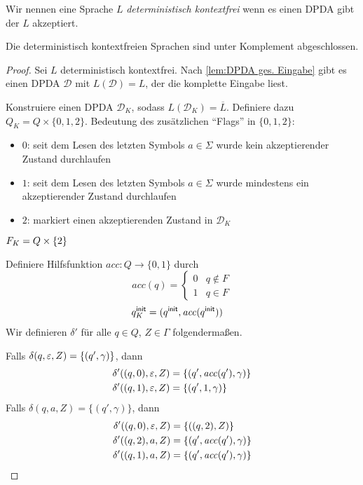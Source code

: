 \begin{Def}
 Wir nennen eine Sprache $L$ \emph{deterministisch kontextfrei} wenn es einen \ac{DPDA} gibt der $L$ akzeptiert.
\end{Def}


\begin{Satz}[name={[Abgeschlossenheit der deterministischen \acs*{CFL}]}]
        Die deterministisch kontextfreien Sprachen sind unter Komplement abgeschlossen.
\end{Satz}
\begin{proof}
  Sei $L$ deterministisch kontextfrei. 
  Nach \autoref{lem:DPDA ges. Eingabe} gibt es einen \ac{DPDA} $\mathcal{D}$ mit $L(\mathcal{D})=L$, der die komplette Eingabe liest.

  Konstruiere einen \ac{DPDA} $\mathcal{D}_K$, sodass $ L(\mathcal{D}_K) = \overline{L}$. 
  Definiere dazu $Q_K= Q \times \{0,1,2\}$. Bedeutung des zusätzlichen "`Flags"' in $\{0,1,2\}$:
  \begin{itemize}
  \item $0$: seit dem Lesen des letzten Symbols $a \in \Sigma$ wurde kein akzeptierender Zustand durchlaufen
  \item $1$: seit dem Lesen des letzten Symbols $a \in \Sigma$ wurde mindestens ein
    akzeptierender Zustand durchlaufen 
  \item $2$: markiert einen akzeptierenden Zustand in $\mathcal{D}_K$
  \end{itemize}
        
  $F_K=Q\times \{2\}$

  Definiere Hilfsfunktion $\mathit{acc}:Q\to \{0,1\}$ durch 
  \begin{displaymath}
    \mathit{acc} (q) =
    \begin{cases}
      0 & q\notin F \\ 1 & q \in F
    \end{cases}
  \end{displaymath}
  \begin{align*}
    q^\mathsf{init}_K &= (q^\mathsf{init},\mathit{acc} (q^\mathsf{init}))
  \end{align*}
  Wir definieren $\delta'$ für alle $q \in Q$, $Z\in\Gamma$ folgendermaßen.
  
  Falls $\delta(q,\varepsilon,Z) = \{(q',\gamma)\}$, dann
  \begin{align*}
    \delta'((q,0),\varepsilon,Z) &= \{(q',\mathit{acc} (q'),\gamma)\}
    \\
    \delta'((q,1),\varepsilon,Z) &= \{(q',1,\gamma)\}
  \end{align*}
  Falls $\delta(q,a,Z) = \{(q',\gamma)\}$, dann
  \begin{align*}
    \delta'((q,0), \Eps, Z) &= \{ ((q,2), Z) \} \\
    \delta'((q,2), a, Z) &=\{(q',\mathit{acc} (q'), \gamma)\}
    \\
    \delta'((q,1), a, Z) &=
    \{(q',\mathit{acc} (q'), \gamma)\}
    \qedhere    %
  \end{align*}
\end{proof}

